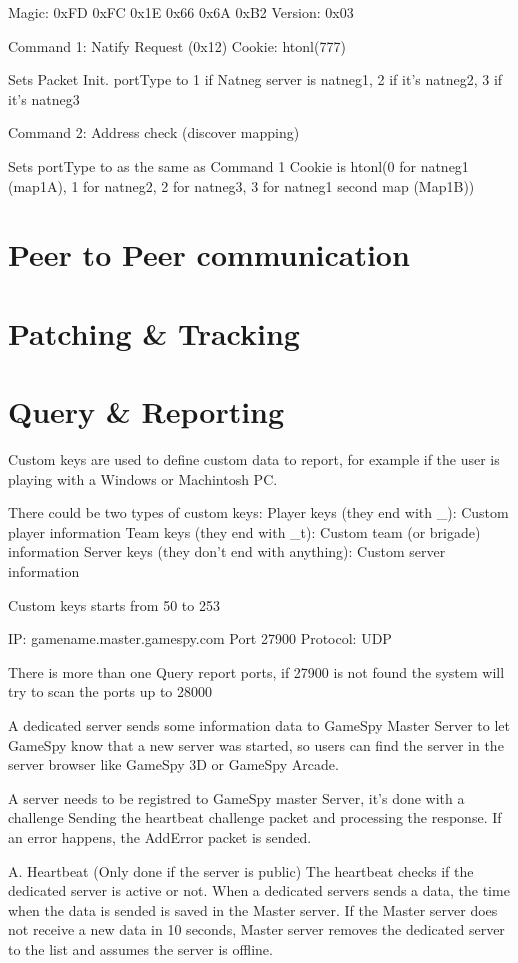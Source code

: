 \documentclass[oneside,titlepage,a4paper]{Definition/retrospy} %
\begin{document}
Magic: 0xFD 0xFC 0x1E 0x66 0x6A 0xB2
Version: 0x03

Command 1: Natify Request (0x12)
Cookie: htonl(777)

Sets Packet Init. portType to 1 if Natneg server is natneg1, 2 if it's natneg2, 3 if it's natneg3

Command 2: Address check (discover mapping)

Sets portType to as the same as Command 1
Cookie is htonl(0 for natneg1 (map1A), 1 for natneg2, 2 for natneg3, 3 for natneg1 second map (Map1B))

\part{Peer to Peer communication}
\part{Patching \& Tracking}
\part{Query \& Reporting}
Custom keys are used to define custom data to report, for example if the user is playing with a
Windows or Machintosh PC.

There could be two types of custom keys:
Player keys (they end with \_):
Custom player information
Team keys (they end with \_t):
Custom team (or brigade) information
Server keys (they don't end with anything):
Custom server information

Custom keys starts from 50 to 253


IP: gamename.master.gamespy.com
Port 27900
Protocol: UDP

There is more than one Query report ports, if 27900 is not found the system will 
try to scan the ports up to 28000

A dedicated server sends some information data to GameSpy Master Server to let GameSpy know
that a new server was started, so users can find the server in the server browser
like GameSpy 3D or GameSpy Arcade.

A server needs to be registred to GameSpy master Server, it's done with a challenge
Sending the heartbeat challenge packet and processing the response.
If an error happens, the AddError packet is sended.

A. Heartbeat (Only done if the server is public)
The heartbeat checks if the dedicated server is active or not.
When a dedicated servers sends a data, the time when the data is sended is saved in the Master server.
If the Master server does not receive a new data in 10 seconds, Master server removes the dedicated server
to the list and assumes the server is offline.
\end{document}

